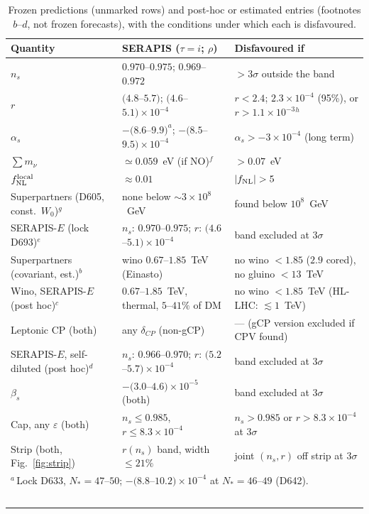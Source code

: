 \documentclass[aps,prd,twocolumn,superscriptaddress,nofootinbib,floatfix]{revtex4-2}
\begin{document}
\begin{table}[tbp]
\caption{Frozen predictions (unmarked rows) and post-hoc or estimated entries (footnotes $b$--$d$, not frozen forecasts), with the conditions under which each is disfavoured.}\label{tab:forward}
\begin{ruledtabular}
\begin{tabular}{lll}
Quantity & SERAPIS ($\tau=i$; $\rho$) & Disfavoured if \\
\hline
$n_s$ & $0.970$--$0.975$; $0.969$--$0.972$ & $>3\sigma$ outside the band \\
$r$ & $(4.8$--$5.7)$; $(4.6$--$5.1)\times10^{-4}$ & $r<2.4$; $2.3\times10^{-4}$ (95\%), or $r>1.1\times10^{-3}$$^h$ \\
$\alpha_s$ & $-(8.6$--$9.9)^a$; $-(8.5$--$9.5)\times10^{-4}$ & $\alpha_s>-3\times10^{-4}$ (long term) \\
$\sum m_\nu$ & $\simeq0.059$~eV (if NO)$^f$ & $>0.07$~eV \\
$f_{\rm NL}^{\rm local}$ & $\approx 0.01$ & $|f_{\rm NL}|>5$ \\
Superpartners (D605, const.\ $W_0$)$^g$ & none below $\sim3\times10^8$~GeV & found below $10^8$~GeV \\
SERAPIS-$E$ (lock D693)$^e$ & $n_s$: $0.970$--$0.975$; $r$: $(4.6$--$5.1)\times10^{-4}$ & band excluded at $3\sigma$ \\
Superpartners (covariant, est.)$^b$ & wino $0.67$--$1.85$~TeV (Einasto) & no wino $<1.85$ ($2.9$ cored), no gluino $<13$~TeV \\
Wino, SERAPIS-$E$ (post hoc)$^c$ & $0.67$--$1.85$~TeV, thermal, $5$--$41\%$ of DM & no wino $<1.85$~TeV (HL-LHC: $\lesssim1$~TeV) \\
Leptonic CP (both) & any $\delta_{CP}$ (non-gCP) & --- (gCP version excluded if CPV found) \\
SERAPIS-$E$, self-diluted (post hoc)$^d$ & $n_s$: $0.966$--$0.970$; $r$: $(5.2$--$5.7)\times10^{-4}$ & band excluded at $3\sigma$ \\
$\beta_s$ & $-(3.0$--$4.6)\times10^{-5}$ (both) & band excluded at $3\sigma$ \\
Cap, any $\varepsilon$ (both) & $n_s\le0.985$, $r\le8.3\times10^{-4}$ & $n_s>0.985$ or $r>8.3\times10^{-4}$ at $3\sigma$ \\
Strip (both, Fig.~\ref{fig:strip}) & $r(n_s)$ band, width $\le21\%$ & joint $(n_s,r)$ off strip at $3\sigma$ \\
\multicolumn{3}{l}{$^a$\,Lock D633, $N_*=47$--$50$; $-(8.8$--$10.2)\times10^{-4}$ at $N_*=46$--$49$ (D642).} \\
$$
\end{tabular}
\end{ruledtabular}
\end{table}
\end{document}
